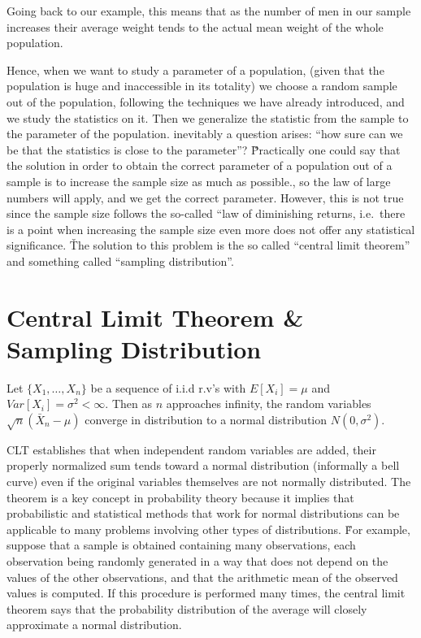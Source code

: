 \be
Going back to our example, this means that as the number of men in our sample increases their average weight tends to
the actual mean weight of the whole population.
\ee

Hence, when we want to study a parameter of a population, (given that the population is huge and inaccessible in its
totality) we choose a random sample out of the population, following the techniques we have already introduced, and
we study the statistics on it. Then we generalize the statistic from the sample to the parameter of the population.
inevitably a question arises: ``how sure can we be that the statistics is close to the parameter''? \v

Practically one could say that the solution in order to obtain the correct parameter of a population out of a sample
is to increase the sample size as much as possible., so the law of large numbers will apply, and we get the correct
parameter. However, this is not true since the sample size follows the so-called ``law of diminishing returns, i.e.\
there is a point when increasing the sample size even more does not offer any statistical significance. \v

The solution to this problem is the so called ``central limit theorem'' and something called ``sampling distribution''.

\section{Central Limit Theorem \& Sampling Distribution}

Let $\{X_{1},\ldots,X_{n}\}$ be a sequence of i.i.d r.v's with $E[X_{i}]=\mu$ and $Var[X_{i}] = \sigma^{2} < \infty$.
Then as $n$ approaches infinity, the random variables $ \sqrt{n} ({\bar {X}}_{n} - \mu)$ converge in distribution
to a normal distribution $N(0,\sigma ^{2})$.
\et

CLT establishes that when independent random variables are added, their properly normalized sum tends toward a normal
distribution (informally a bell curve) even if the original variables themselves are not normally distributed. The
theorem is a key concept in probability theory because it implies that probabilistic and statistical methods that
work for normal distributions can be applicable to many problems involving other types of distributions. \v

For example, suppose that a sample is obtained containing many observations, each observation being randomly
generated in a way that does not depend on the values of the other observations, and that the arithmetic mean of the
observed values is computed. If this procedure is performed many times, the central limit theorem says that the
probability distribution of the average will closely approximate a normal distribution.

